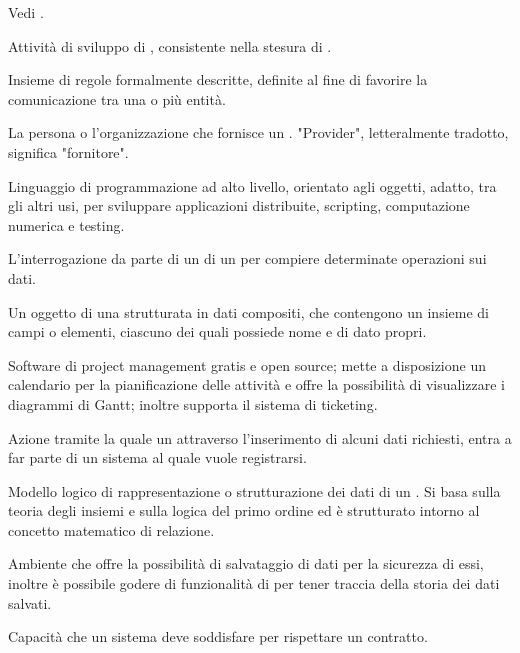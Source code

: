 {Vedi .}

{Attività di sviluppo di , consistente nella stesura di .}

{Insieme di regole formalmente descritte, definite al fine di favorire la comunicazione tra una o più entità.}


{La persona o l'organizzazione che fornisce un . "Provider", letteralmente tradotto, significa "fornitore".}

{Linguaggio di programmazione ad alto livello, orientato agli oggetti, adatto, tra gli altri usi, per sviluppare applicazioni distribuite, scripting, computazione numerica e testing.}



{L'interrogazione da parte di un  di un  per compiere determinate operazioni sui dati.}




{Un oggetto di una  strutturata in dati compositi, che contengono un insieme di campi o elementi, ciascuno dei quali possiede nome e  di dato propri.}

{Software di project management gratis e open source; mette a disposizione un calendario per la pianificazione delle attività e offre la possibilità di visualizzare i diagrammi di Gantt; inoltre supporta il sistema di ticketing.}

{Azione tramite la quale un  attraverso l'inserimento di alcuni dati richiesti, entra a far parte di un sistema al quale vuole registrarsi.}

{Modello logico di rappresentazione o strutturazione dei dati di un . Si basa sulla teoria degli insiemi e sulla logica del primo ordine ed è strutturato intorno al concetto matematico di relazione.}

{Ambiente che offre la possibilità di salvataggio di dati per la sicurezza di essi, inoltre è possibile godere di funzionalità di  per tener traccia della storia dei dati salvati.}

{Capacità che un sistema  deve soddisfare per rispettare un contratto.}

